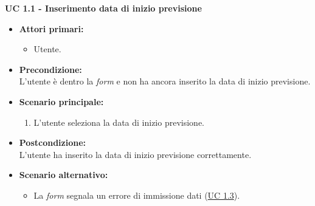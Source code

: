 \noindent \textbf{\large UC 1.1 - Inserimento data di inizio previsione}
\label{uc:inserimento-data-inizio-prev}
\begin{itemize}

	\item \textbf{Attori primari: }
		\begin{itemize}
			\item Utente.
		\end{itemize}

	\item \textbf{Precondizione: }\\[0.3cm]
		L'utente è dentro la \textit{form} e non ha ancora inserito la data di inizio previsione.

	\item \textbf{Scenario principale: }
		\begin{enumerate}
			\item L'utente seleziona la data di inizio previsione.
		\end{enumerate}

	\item \textbf{Postcondizione: }\\[0.3cm]
		L'utente ha inserito la data di inizio previsione correttamente.

	\item \textbf{Scenario alternativo: }
		\begin{itemize}
		    \item La \textit{form} segnala un errore di immissione dati (\hyperref[uc:err-inserimento-data-inizio-prev]{UC 1.3}).
		\end{itemize}

\end{itemize}

\vspace{0.4cm}


\newpage

